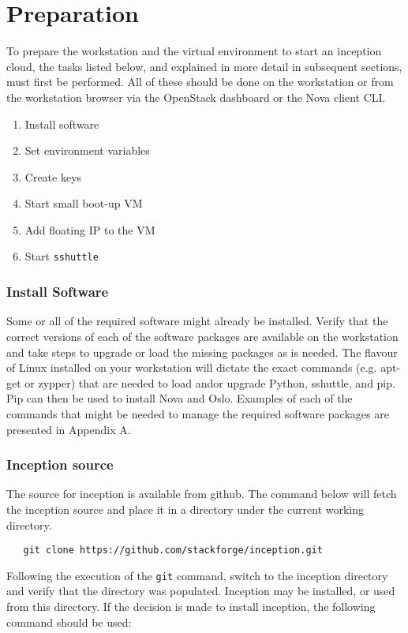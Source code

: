 \section{Preparation}
To prepare the workstation and the virtual environment to start an inception cloud, the tasks listed below, and 
explained in more detail in subsequent sections,  must first be performed. 
All of these should be done on the workstation or from the workstation browser via the OpenStack dashboard or the 
Nova client CLI. 

\begin{enumerate}
\item Install software
\item Set environment variables
\item Create keys
\item Start small boot-up VM
\item Add floating IP to the VM
\item Start \verb!sshuttle!
\end{enumerate}

\subsubsection{Install Software}
Some or all of the required software might already be installed. 
Verify that the correct versions of each of the software packages are available on the workstation
and take steps to upgrade or load the missing packages as is needed.  
The flavour of Linux installed on your workstation will dictate the exact commands (e.g. apt-get or zypper)
that are needed to load and\/or upgrade Python, sshuttle, and pip. 
Pip can then be used to install Nova and Oslo. 
Examples of each of the commands that might be needed to manage the required software packages are presented 
in Appendix A. 

\subsubsection{Inception source}
The source for inception is available from github.
The command below will fetch the inception source and place it in a directory under the current working directory.

\small\begin{verbatim}
   git clone https://github.com/stackforge/inception.git
\end{verbatim}\normalsize

Following the execution of the \verb!git! command, switch to the inception directory and verify that the 
directory was populated.  
Inception may be installed, or used from this directory.  
If the decision is made to install inception, the following command should be used:

